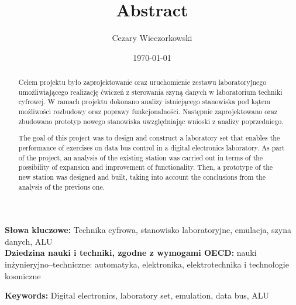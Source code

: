 \documentclass[../main.tex]{subfiles}
\author{Cezary Wieczorkowski}
\date{\today}
\title{Abstract}
\begin{document}
\begin{abstract}
Celem projektu było zaprojektowanie oraz uruchomienie zestawu laboratoryjnego umożliwiającego
realizację ćwiczeń z sterowania szyną danych w laboratorium techniki cyfrowej. W ramach projektu dokonano analizy
istniejącego stanowiska pod kątem możliwości rozbudowy oraz poprawy funkcjonalności. Następnie zaprojektowano oraz 
zbudowano prototyp nowego stanowiska uwzględniając wnioski z analizy poprzedniego.
\end{abstract}
\textbf{Słowa kluczowe:} Technika cyfrowa, stanowisko laboratoryjne, emulacja, szyna danych, ALU \\
\textbf{Dziedzina nauki i techniki, zgodne z wymogami OECD:} nauki inżynieryjno--techniczne: automatyka, elektronika, 
elektrotechnika i technologie kosmiczne
\newpage
{}
\begin{abstract}
The goal of this project was to design and construct a laboratory set that enables the performance of 
exercises on data bus control in a digital electronics laboratory. As part of the project, an analysis of the existing 
station was carried out in terms of the possibility of expansion and improvement of functionality. Then, a prototype of 
the new station was designed and built, taking into account the conclusions from the analysis of the previous one.
\end{abstract}
\textbf{Keywords:} Digital electronics, laboratory set, emulation, data bus, ALU \\
\end{document}
